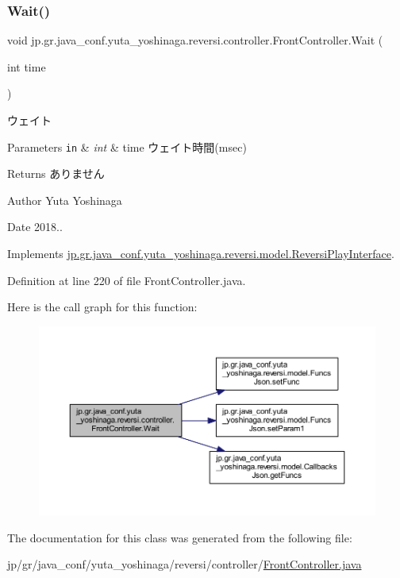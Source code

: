 \subsubsection{\texorpdfstring{Wait()}{Wait()}}
{\footnotesize\ttfamily void jp.\+gr.\+java\+\_\+conf.\+yuta\+\_\+yoshinaga.\+reversi.\+controller.\+Front\+Controller.\+Wait (\begin{DoxyParamCaption}\item[{int}]{time }\end{DoxyParamCaption})}



ウェイト 


\begin{DoxyParams}[1]{Parameters}
\mbox{\tt in}  & {\em int} & time ウェイト時間(msec) \\
\hline
\end{DoxyParams}
\begin{DoxyReturn}{Returns}
ありません 
\end{DoxyReturn}
\begin{DoxyAuthor}{Author}
Yuta Yoshinaga 
\end{DoxyAuthor}
\begin{DoxyDate}{Date}
2018.. 
\end{DoxyDate}


Implements \hyperlink{interfacejp_1_1gr_1_1java__conf_1_1yuta__yoshinaga_1_1reversi_1_1model_1_1_reversi_play_interface_abd7fc4193840e8c7bdf95bc538e1b649}{jp.\+gr.\+java\+\_\+conf.\+yuta\+\_\+yoshinaga.\+reversi.\+model.\+Reversi\+Play\+Interface}.



Definition at line 220 of file Front\+Controller.\+java.

Here is the call graph for this function\+:
\nopagebreak
\begin{figure}[H]
\begin{center}
\leavevmode
\includegraphics[width=350pt]{classjp_1_1gr_1_1java__conf_1_1yuta__yoshinaga_1_1reversi_1_1controller_1_1_front_controller_af513d1ccfca9fc00f93fb650f1f08b05_cgraph}
\end{center}
\end{figure}


The documentation for this class was generated from the following file\+:\begin{DoxyCompactItemize}
\item 
jp/gr/java\+\_\+conf/yuta\+\_\+yoshinaga/reversi/controller/\hyperlink{_front_controller_8java}{Front\+Controller.\+java}\end{DoxyCompactItemize}
